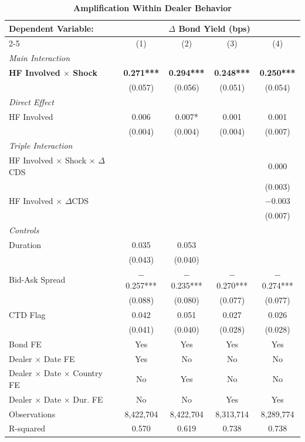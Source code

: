 \documentclass[english, 11pt, oneside]{article}
\begin{document}
\begin{table}[t]
\centering
\caption{\textbf{Amplification Within Dealer Behavior}}
\footnotesize
\setlength{\tabcolsep}{8pt}
\renewcommand{\arraystretch}{1.1}
\begin{tabular}{l c c c c}
\toprule
\textbf{Dependent Variable:} & \multicolumn{4}{c}{\textbf{$\Delta$ Bond Yield (bps)}} \\
\cmidrule(lr){2-5}
 & (1) & (2) & (3) & (4) \\
\midrule
\textit{Main Interaction} & & & & \\
\textbf{HF Involved $\times$ Shock} & \textbf{0.271***} & \textbf{0.294***} & \textbf{0.248***} & \textbf{0.250***} \\
 & (0.057) & (0.056) & (0.051) & (0.054) \\
\addlinespace
\textit{Direct Effect} & & & & \\
HF Involved & 0.006 & 0.007* & 0.001 & 0.001 \\
 & (0.004) & (0.004) & (0.004) & (0.007) \\
\addlinespace
\textit{Triple Interaction} & & & & \\
HF Involved $\times$ Shock $\times$ $\Delta$CDS & & & & 0.000 \\
 & & & & (0.003) \\
HF Involved $\times$ $\Delta$CDS & & & & $-$0.003 \\
 & & & & (0.007) \\
\addlinespace
\textit{Controls} & & & & \\
Duration & 0.035 & 0.053 &  &  \\
 & (0.043) & (0.040) &  &  \\
Bid-Ask Spread & $-$0.257*** & $-$0.235*** & $-$0.270*** & $-$0.274*** \\
 & (0.088) & (0.080) & (0.077) & (0.077) \\
CTD Flag & 0.042 & 0.051 & 0.027 & 0.026 \\
 & (0.041) & (0.040) & (0.028) & (0.028) \\
\midrule
Bond FE & Yes & Yes & Yes & Yes \\
Dealer $\times$ Date FE & Yes & No & No & No \\
Dealer $\times$ Date $\times$ Country FE & No & Yes & No & No \\
Dealer $\times$ Date $\times$ Dur. FE & No & No & Yes & Yes \\
\midrule
Observations & 8,422,704 & 8,422,704 & 8,313,714 & 8,289,774 \\
R-squared & 0.570 & 0.619 & 0.738 & 0.738 \\

\end{tabular}
\end{table}
\end{document}
